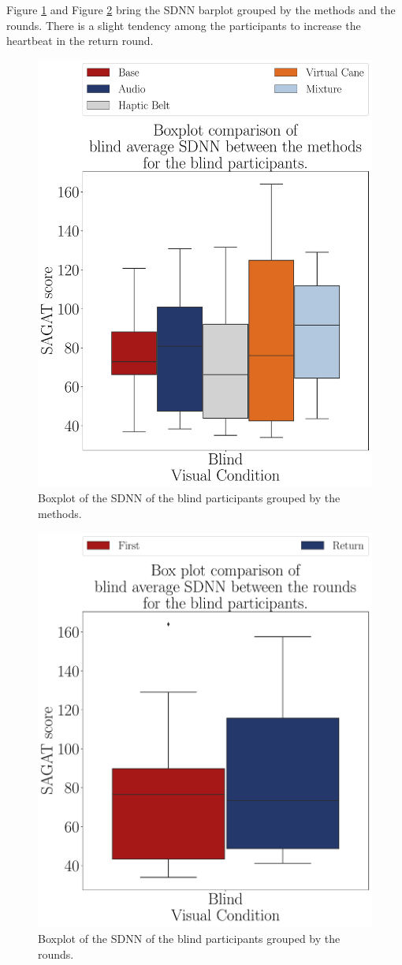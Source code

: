 Figure \ref{fig:boxplot_ecg_sdnn_blind_scene} and Figure \ref{fig:boxplot_ecg_sdnn_blind_rounds} bring the SDNN barplot grouped by the methods and the rounds. There is a slight tendency among the participants to increase the heartbeat in the return round.

\begin{figure}[!htb]
    \centering
    \includegraphics[width = 0.75\linewidth]{Resultados/ECG/Figuras/pdf/boxplot_ecg_sdnn_blind_scene.pdf}
    \caption{Boxplot of the SDNN of the blind participants grouped by the methods.}
    \label{fig:boxplot_ecg_sdnn_blind_scene}
\end{figure}
\begin{figure}[!htb]
    \centering
    \includegraphics[width = 0.75\linewidth]{Resultados/ECG/Figuras/pdf/boxplot_ecg_sdnn_blind_rounds.pdf}
    \caption{Boxplot of the SDNN of the blind participants grouped by the rounds.}
    \label{fig:boxplot_ecg_sdnn_blind_rounds}
\end{figure}

